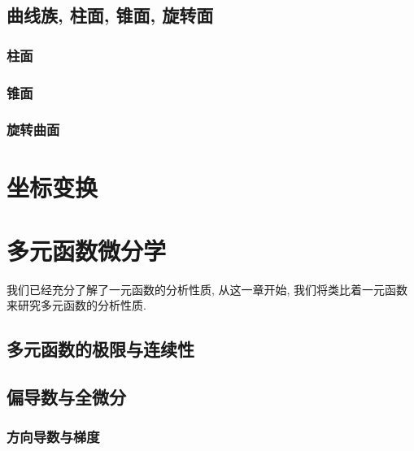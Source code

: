 \documentclass[cn,toc=twocol]{elegantbook}
\begin{document}
\section{曲线族, 柱面, 锥面, 旋转面}

\subsection{柱面}

\subsection{锥面}

\subsection{旋转曲面}



\chapter{坐标变换}


\chapter{多元函数微分学}

我们已经充分了解了一元函数的分析性质, 从这一章开始, 我们将类比着一元函数来研究多元函数的分析性质.

\section{多元函数的极限与连续性}


\section{偏导数与全微分}



\subsection{方向导数与梯度}
\end{document}
